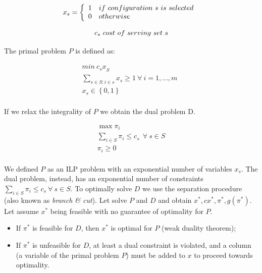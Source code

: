 \begin{equation}
	x_s=\left\{
                \begin{array}{ll}
                  1  & if\ configuration\ s\ is\ selected\\
                  0 & otherwise\\
                \end{array}
              \right.\\
\label{eq_dualProblemProblemVariables1}
\end{equation}

\begin{equation}
	c_s\ cost\ of\ serving\ set\ s \\
\label{eq_dualProblemProblemVariables2}
\end{equation}

The primal problem $P$ is defined as:

\begin{equation}
\begin{split}
    min\ {c_sx}_S\\
    \sum_{s\in S:i\in s}{x_s\geq1}\ \forall\ i=1,\ldots,m\ \ \\
    x_s\in\left\{0,1\right\}\\
\end{split}
\label{eq_dualProblemPrimal}
\end{equation}

If we relax the integrality of $P$  we obtain the dual problem D.

\begin{equation}
\begin{split}
    \max{\pi_i}\\
    \sum_{i\in S}{\pi_i\le c_s\ \ \forall\ s\in S}\\
    \pi_i\geq0\\
\end{split}
\label{eq_dualProblemDual}
\end{equation}

We defined $P$ as an ILP problem with an exponential number of variables $x_s$. The dual problem, instead, has an exponential number of constraints $\sum_{i\in S}{\pi_i\le c_s\ \forall\ s\in S}$. To optimally solve $D$ we use the separation procedure (also known as \textit{branch \& cut}). Let solve $P$ and $D$ and obtain $x^\ast,cx^\ast,\pi^\ast,g\left(\pi^\ast\right)$. Let assume $x^\ast$ being feasible with no guarantee of optimality for $P$.
\begin{itemize}
    \item If $\pi^\ast$ is feasible for $D$, then $x^\ast$ is optimal for $P$ (weak duality theorem);
    \item If $\pi^\ast$ is unfeasible for $D$, at least a dual constraint is violated, and a column (a variable of the primal problem $P$) must be added to $x$ to proceed towards optimality.
\end{itemize}

